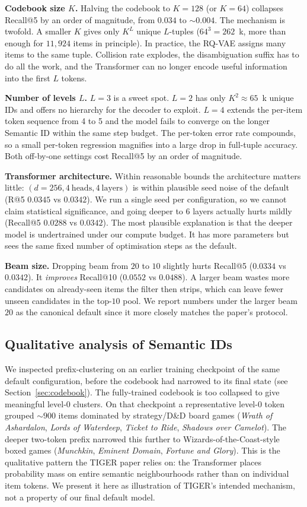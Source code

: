 \documentclass[sigconf]{acmart}
\begin{document}
\textbf{Codebook size $K$.}  Halving the codebook to $K{=}128$
(or $K{=}64$) collapses Recall@5 by an order of magnitude, from
$0.034$ to $\sim 0.004$.  The mechanism is twofold.  A smaller $K$
gives only $K^L$ unique $L$-tuples ($64^3 = 262$~k, more than enough
for $11{,}924$ items in principle).  In practice, the RQ-VAE assigns
many items to the same tuple.  Collision rate explodes, the
disambiguation suffix has to do all the work, and the Transformer can
no longer encode useful information into the first $L$ tokens.

\textbf{Number of levels $L$.}  $L{=}3$ is a sweet spot.  $L{=}2$ has
only $K^2 \approx 65$~k unique IDs and offers no hierarchy for the
decoder to exploit. $L{=}4$ extends the per-item token sequence from
4 to 5 and the model fails to converge on the longer Semantic ID
within the same step budget. The per-token error rate compounds, so
a small per-token regression magnifies into a large drop in full-tuple
accuracy.  Both off-by-one settings cost Recall@5 by an order of
magnitude.

\textbf{Transformer architecture.}  Within reasonable bounds the
architecture matters little: $(d{=}256, 4~\text{heads}, 4~\text{layers})$
is within plausible seed noise of the default
(R@5 $0.0345$ vs $0.0342$). We run a single seed per configuration, so
we cannot claim statistical significance, and going deeper to $6$ layers actually
hurts mildly (Recall@5 $0.0288$ vs $0.0342$).
The most plausible explanation is that the deeper model is
undertrained under our compute budget. It has more parameters but
sees the same fixed number of optimisation steps as the default.

\textbf{Beam size.}  Dropping beam from $20$ to $10$ slightly hurts
Recall@5 ($0.0334$ vs $0.0342$). It \emph{improves} Recall@10
($0.0552$ vs $0.0488$).  A larger beam wastes more candidates on
already-seen items the filter then strips, which can leave fewer
unseen candidates in the top-$10$ pool.  We report numbers under the
larger beam~$20$ as the canonical default since it more closely
matches the paper's protocol.

\subsection{Qualitative analysis of Semantic IDs}
\label{sec:qual}
We inspected prefix-clustering on an earlier training checkpoint of
the same default configuration, before the codebook had narrowed to
its final state (see Section~\ref{sec:codebook}).  The fully-trained
codebook is too collapsed to give meaningful level-0 clusters.  On that checkpoint a representative level-0 token grouped
$\sim\!900$ items dominated by strategy/D\&D board games
(\textit{Wrath of Ashardalon}, \textit{Lords of Waterdeep},
\textit{Ticket to Ride}, \textit{Shadows over Camelot}). The deeper
two-token prefix narrowed this further to Wizards-of-the-Coast-style
boxed games (\textit{Munchkin}, \textit{Eminent Domain},
\textit{Fortune and Glory}).  This is the qualitative pattern the
TIGER paper relies on: the Transformer places probability mass on
entire semantic neighbourhoods rather than on individual item
tokens.  We present it here as illustration of TIGER's intended
mechanism, not a property of our final default model.
\end{document}
